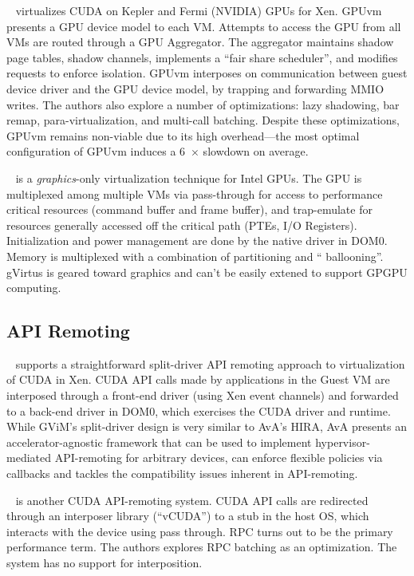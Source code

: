 ~\cite{suzuki2014gpuvm} virtualizes CUDA on Kepler and
Fermi (NVIDIA) GPUs for Xen. GPUvm presents a GPU device model to each VM.
Attempts to access the GPU from all VMs are routed through a GPU Aggregator.
The aggregator maintains shadow page tables, shadow channels, implements a
``fair share scheduler'', and modifies requests to enforce isolation. GPUvm
interposes on communication between guest device driver and the GPU device
model, by trapping and forwarding MMIO writes. The authors also explore a
number of optimizations: lazy shadowing, bar remap, para-virtualization, and
multi-call batching. Despite these optimizations, GPUvm remains non-viable due to its high overhead---the most optimal configuration of GPUvm induces a 6~$\times$ slowdown on average.

~\cite{tian2014full} is a \emph{graphics}-only
virtualization technique for Intel GPUs. The GPU is multiplexed among multiple
VMs via pass-through for access to performance critical resources (command
buffer and frame buffer), and trap-emulate for resources generally accessed
off the critical path (PTEs, I/O Registers). Initialization and power
management are done by the native driver in DOM0. Memory is multiplexed with a
combination of partitioning and `` ballooning''. gVirtus is geared toward
graphics and can't be easily extened to support GPGPU computing.

\subsection{API Remoting}

~\cite{gupta2009gvim} supports a straightforward
split-driver API remoting approach to virtualization of CUDA in Xen.
CUDA API calls made by applications in the Guest VM are interposed through a
front-end driver (using Xen event channels) and forwarded to a back-end driver
in DOM0, which exercises the CUDA driver and runtime. While GViM's
split-driver design is very similar to AvA's HIRA, AvA presents an
accelerator-agnostic framework that can be used to implement
hypervisor-mediated API-remoting for arbitrary devices, can enforce flexible
policies via callbacks and tackles the compatibility issues inherent in
API-remoting.

~\cite{vCUDA} is another CUDA API-remoting system.
CUDA API calls are redirected through an interposer library (``vCUDA'') to a
stub in the host OS, which interacts with the device using pass through. RPC
turns out to be the primary performance term. The authors explores RPC
batching as an optimization. The system has no support for interposition.

